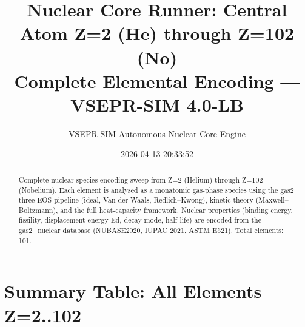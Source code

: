 \documentclass[11pt,a4paper]{article}
\title{Nuclear Core Runner: Central Atom Z=2 (He) through Z=102 (No)\\
       \large Complete Elemental Encoding --- VSEPR-SIM 4.0-LB}
\author{VSEPR-SIM Autonomous Nuclear Core Engine}
\date{2026-04-13 20:33:52}
\begin{document}
\maketitle

\begin{abstract}
Complete nuclear species encoding sweep from Z=2 (Helium) through Z=102 (Nobelium). Each element is analysed as a monatomic gas-phase species using the gas2 three-EOS pipeline (ideal, Van der Waals, Redlich--Kwong), kinetic theory (Maxwell--Boltzmann), and the full heat-capacity framework. Nuclear properties (binding energy, fissility, displacement energy Ed, decay mode, half-life) are encoded from the gas2\_nuclear database (NUBASE2020, IUPAC 2021, ASTM E521). Total elements: 101.
\end{abstract}
\tableofcontents
\newpage

\section{Summary Table: All Elements Z=2..102}
\end{document}

